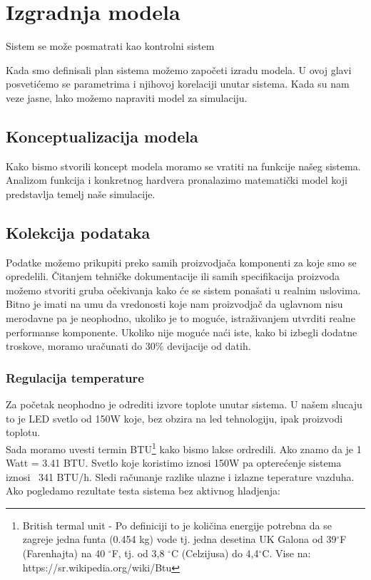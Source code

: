 \documentclass[a4paper,11pt]{book}
\begin{document}
\chapter{Izgradnja modela}

Sistem se može posmatrati kao kontrolni sistem

Kada smo definisali plan sistema možemo započeti izradu modela. U ovoj glavi posvetićemo se parametrima i njihovoj korelaciji unutar sistema. Kada su nam veze jasne, lako možemo napraviti model za simulaciju.

\section{Konceptualizacija modela}

Kako bismo stvorili koncept modela moramo se vratiti na funkcije našeg sistema. Analizom funkcija i konkretnog hardvera pronalazimo matematički model koji predstavlja temelj naše simulacije.\\




\section{Kolekcija podataka}

Podatke možemo prikupiti preko samih proizvodjača komponenti za koje smo se opredelili. Čitanjem tehničke dokumentacije ili samih specifikacija proizvoda možemo stvoriti gruba očekivanja kako će se sistem ponašati u realnim uslovima. \\

\noindent Bitno je imati na umu da vredonosti koje nam proizvodjač da uglavnom nisu merodavne pa je neophodno, ukoliko je to moguće, istraživanjem utvrditi realne performanse komponente. Ukoliko nije moguće naći iste, kako bi izbegli dodatne troskove, moramo uračunati do 30\% devijacije od datih.

\subsection{Regulacija temperature}

Za početak neophodno je odrediti izvore toplote unutar sistema. U našem slucaju to je LED svetlo od 150W koje, bez obzira na led tehnologiju, ipak proizvodi toplotu.\\

Sada moramo uvesti termin BTU\footnote{British termal unit - Po definiciji to je količina energije potrebna da se zagreje jedna funta (0.454 kg) vode tj. jedna desetina UK Galona od 39$^\circ$F (Farenhajta) na 40 $^\circ$F, tj. od 3,8 $^\circ$C (Celzijusa) do 4,4$^\circ$C. Vise na: https://sr.wikipedia.org/wiki/Btu} kako bismo lakse ordredili. Ako znamo da je 1 Watt = 3.41 BTU. Svetlo koje koristimo iznosi 150W pa opterećenje sistema iznosi ~341 BTU/h. Sledi računanje razlike ulazne i izlazne teperature vazduha. Ako pogledamo rezultate testa sistema bez aktivnog hladjenja:
\end{document}
